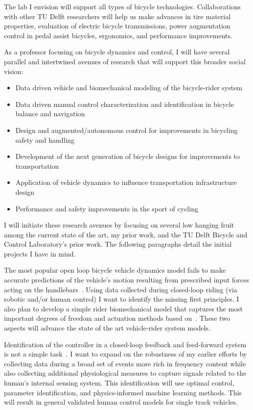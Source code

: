 \documentclass{article}
\begin{document}
The lab I envision will support all types of bicycle technologies.
Collaborations with other TU Delft researchers will help us make advances in
tire material properties, evaluation of electric bicycle transmissions, power
augmentation control in pedal assist bicycles, ergonomics, and performance
improvements.

As a professor focusing on bicycle dynamics and control, I will have several
parallel and intertwined avenues of research that will support this broader
social vision:
%
\begin{itemize}
  \setlength\itemsep{0.1em}
  \item Data driven vehicle and biomechanical modeling of the bicycle-rider
    system
  \item Data driven manual control characterization and identification in
    bicycle balance and navigation
  \item Design and augmented/autonomous control for improvements in bicycling
    safety and handling
  \item Development of the next generation of bicycle designs for improvements
    to transportation
  \item Application of vehicle dynamics to influence transportation
    infrastructure design
  \item Performance and safety improvements in the sport of cycling
\end{itemize}

I will initiate these research avenues by focusing on several low hanging fruit
among the current state of the art, my prior work, and the TU Delft Bicycle and
Control Laboratory's prior work. The following paragraphs detail the initial
projects I have in mind.

The most popular open loop bicycle vehicle dynamics model fails to make
accurate predictions of the vehicle's motion resulting from prescribed input
forces acting on the handlebars~\cite{Moore2013a}. Using data collected during
closed-loop riding (via robotic and/or human control) I want to identify the
missing first principles. I also plan to develop a simple rider biomechanical
model that captures the most important degrees of freedom and actuation methods
based on~\cite{Moore2011}. These two aspects will advance the state of the art
vehicle-rider system models.

Identification of the controller in a closed-loop feedback and feed-forward
system is not a simple task~\cite{vanderKooij2005}. I want to expand on the
robustness of my earlier efforts by collecting data during a broad set of
events more rich in frequency content while also collecting additional
physiological measures to capture signals related to the human's internal
sensing system. This identification will use optimal control, parameter
identification, and physics-informed machine learning methods. This will result
in general validated human control models for single track vehicles.
\end{document}
